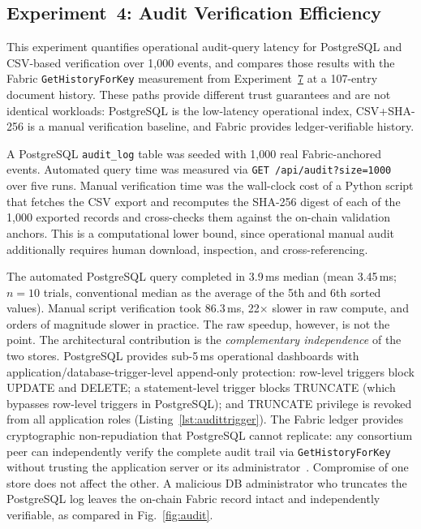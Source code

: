 \documentclass[preprint,12pt]{elsarticle}
\begin{document}
\subsection{Experiment~4: Audit Verification Efficiency}
\label{sec:exp_audit}

This experiment quantifies operational audit-query latency for PostgreSQL and CSV-based verification over 1,000 events, and compares those results with the Fabric \texttt{GetHistoryForKey} measurement from Experiment~\hyperref[sec:exp_gethistory]{7} at a 107-entry document history. These paths provide different trust guarantees and are not identical workloads: PostgreSQL is the low-latency operational index, CSV+SHA-256 is a manual verification baseline, and Fabric provides ledger-verifiable history.

A PostgreSQL \texttt{audit\_log} table was seeded with 1,000 real Fabric-anchored events. Automated query time was measured via \texttt{GET /api/audit?size=1000} over five runs. Manual verification time was the wall-clock cost of a Python script that fetches the CSV export and recomputes the SHA-256 digest of each of the 1,000 exported records and cross-checks them against the on-chain validation anchors. This is a computational lower bound, since operational manual audit additionally requires human download, inspection, and cross-referencing.

The automated PostgreSQL query completed in 3.9\,ms median (mean 3.45\,ms; $n{=}10$ trials, conventional median as the average of the 5th and 6th sorted values). Manual script verification took 86.3\,ms,
22$\times$ slower in raw compute, and orders of magnitude
slower in practice. The raw speedup, however, is not the point. The architectural
contribution is the \emph{complementary independence} of the two stores.
PostgreSQL provides sub-5\,ms operational dashboards with
application/database-trigger-level append-only protection: row-level
triggers block UPDATE and DELETE; a
statement-level trigger blocks TRUNCATE (which bypasses row-level triggers
in PostgreSQL); and TRUNCATE privilege is revoked from all application
roles (Listing~\ref{lst:audittrigger}). The Fabric ledger provides
cryptographic non-repudiation that PostgreSQL cannot replicate: any
consortium peer can independently verify the complete audit trail via
\texttt{GetHistoryForKey} without trusting the application server or its
administrator~\cite{androulaki2018hyperledger, hyperledgerFabricOrderingService_v24}. Compromise of one store does not affect
the other. A malicious DB administrator who truncates the PostgreSQL log
leaves the on-chain Fabric record intact and independently verifiable, as compared in Fig.~\ref{fig:audit}.
\end{document}
